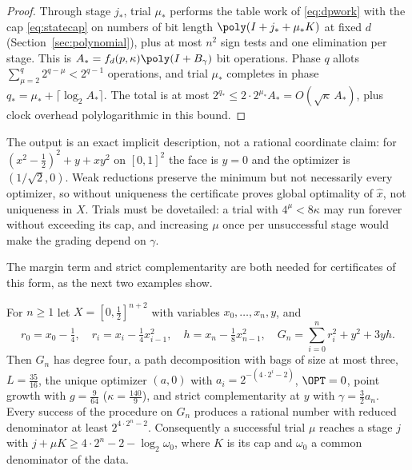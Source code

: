 \begin{proof}
Through stage $j_*$, trial $\mu_*$ performs the table work of
\eqref{eq:dpwork} with the cap \eqref{eq:statecap} on numbers of bit length
$\poly(I+j_*+\mu_*K)$ at fixed $d$ (Section~\ref{sec:polynomial}), plus at most
$n^2$ sign tests and one elimination per stage. This is
$A_*=f_d(p,\kappa)\poly(I+B_\gamma)$ bit operations. Phase $q$ allots
$\sum_{\mu=2}^q2^{q-\mu}<2^{q-1}$ operations, and trial $\mu_*$ completes in
phase $q_*=\mu_*+\lceil\log_2A_*\rceil$. The total is at most
$2^{q_*}\le2\cdot2^{\mu_*}A_*=O(\sqrt\kappa\,A_*)$, plus clock overhead
polylogarithmic in this bound.
\end{proof}

The output is an exact implicit description, not a rational coordinate claim:
for $(x^2-\frac12)^2+y+xy^2$ on $[0,1]^2$ the face is $y=0$ and the optimizer
is $(1/\sqrt2,0)$. Weak reductions preserve the minimum but not necessarily
every optimizer, so without uniqueness the certificate proves global
optimality of $\hat x$, not uniqueness in $X$. Trials must be dovetailed: a
trial with $4^\mu<8\kappa$ may run forever without exceeding its cap, and
increasing $\mu$ once per unsuccessful stage would make the grading depend on
$\gamma$.

The margin term and strict complementarity are both needed for certificates
of this form, as the next two examples show.

\begin{proposition}\label{prop:margin}
For $n\ge1$ let $X=[0,\frac12]^{n+2}$ with variables $x_0,\ldots,x_n,y$, and
\[
r_0=x_0-\tfrac14,\quad r_i=x_i-\tfrac14x_{i-1}^2,\quad
h=x_n-\tfrac18x_{n-1}^2,\quad
G_n=\sum_{i=0}^nr_i^2+y^2+3yh.
\]
Then $G_n$ has degree four, a path decomposition with bags of size at most
three, $L=\frac{35}{16}$, the unique optimizer $(a,0)$ with
$a_i=2^{-(4\cdot2^i-2)}$, $\OPT=0$, point growth with $g=\frac9{64}$
($\kappa=\frac{140}9$), and strict complementarity at $y$ with
$\gamma=\frac32a_n$. Every success of the procedure on $G_n$ produces a
rational number with reduced denominator at least $2^{4\cdot2^n-2}$.
Consequently a successful trial $\mu$ reaches a stage $j$ with
$j+\mu K\ge4\cdot2^n-2-\log_2\omega_0$, where $K$ is its cap and $\omega_0$ a
common denominator of the data.
\end{proposition}

